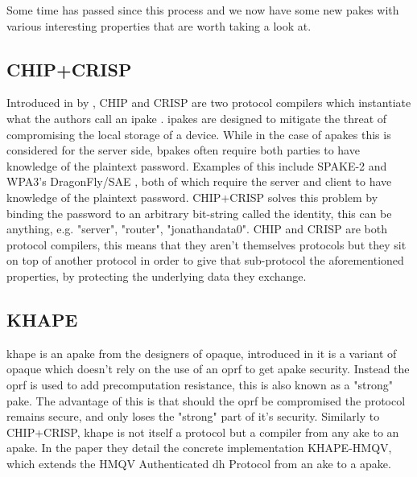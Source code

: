 Some time has passed since this process and we now have some new \glspl{pake} with various interesting properties that are worth taking a look at.

\subsection{CHIP+CRISP}
Introduced in \citeyear{chip+crisp} by \citeauthor{chip+crisp}, CHIP and CRISP are two protocol compilers which instantiate what the authors call an \gls{ipake} \cite{chip+crisp}.
\glspl{ipake} are designed to mitigate the threat of compromising the local storage of a device.
While in the case of \glspl{apake} this is considered for the server side, \glspl{bpake} often require both parties to have knowledge of the plaintext password.
Examples of this include SPAKE-2 \cite{spake} and WPA3's DragonFly/SAE \cite{sae}, both of which require the server and client to have knowledge of the plaintext password.
CHIP+CRISP solves this problem by binding the password to an arbitrary bit-string called the identity, this can be anything, e.g. "server", "router", "jonathandata0".
CHIP and CRISP are both protocol compilers, this means that they aren't themselves protocols but they sit on top of another protocol in order to give that sub-protocol the aforementioned properties, by protecting the underlying data they exchange.

\subsection{KHAPE}
\gls{khape} \cite{khape} is an \gls{apake} from the designers of \gls{opaque}, introduced in \citeyear{khape} it is a variant of \gls{opaque} which doesn't rely on the use of an \gls{oprf} to get \gls{apake} security.
Instead the \gls{oprf} is used to add precomputation resistance, this is also known as a "strong" \gls{pake}.
The advantage of this is that should the \gls{oprf} be compromised the protocol remains secure, and only loses the "strong" part of it's security.
Similarly to CHIP+CRISP, \gls{khape} is not itself a protocol but a compiler from any \gls{ake} to an \gls{apake}.
In the paper they detail the concrete implementation KHAPE-HMQV, which extends the HMQV Authenticated \gls{dh} Protocol from an \gls{ake} to a \gls{apake}.

